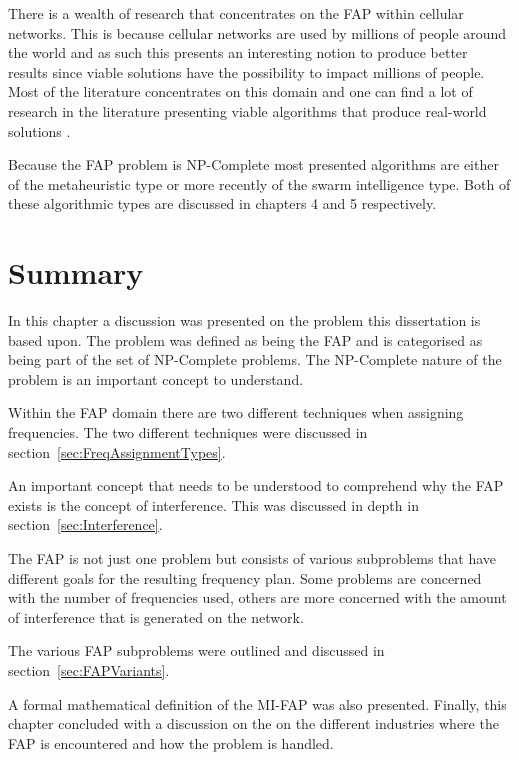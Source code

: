 There is a wealth of research that concentrates on the \gls{FAP} within cellular networks. This is because cellular networks are used by millions of people around the world and as such this presents an interesting notion to produce better results since viable solutions have the possibility to impact millions of people. Most of the literature concentrates on this domain and one can find a lot of research in the literature presenting viable algorithms that produce real-world solutions \cite{Eisenblatter}. 

Because the \gls{FAP} problem is NP-Complete most presented algorithms are either of the metaheuristic type or more recently of the swarm intelligence type. Both of these algorithmic types are discussed in chapters 4 and 5 respectively.
\section{Summary}
In this chapter a discussion was presented on the problem this dissertation is based upon. The problem was defined as being the \gls{FAP} and is categorised as being part of the set of NP-Complete problems. The NP-Complete nature of the problem is an important concept to understand.

Within the \gls{FAP} domain there are two different techniques when assigning frequencies. The two different techniques were discussed in section~\ref{sec:FreqAssignmentTypes}. 

An important concept that needs to be understood to comprehend why the \gls{FAP} exists is the concept of interference. This was discussed in depth in section~\ref{sec:Interference}.

The \gls{FAP} is not just one problem but consists of various subproblems that have different goals for the resulting frequency plan. Some problems are concerned with the number of frequencies used, others are more concerned with the amount of interference that is generated on the network.

The various \gls{FAP} subproblems were outlined and discussed in section~\ref{sec:FAPVariants}.

A formal mathematical definition of the \gls{MI-FAP} was also presented. Finally, this chapter concluded with a discussion on the on the different industries where the FAP is encountered and how the problem is handled.
